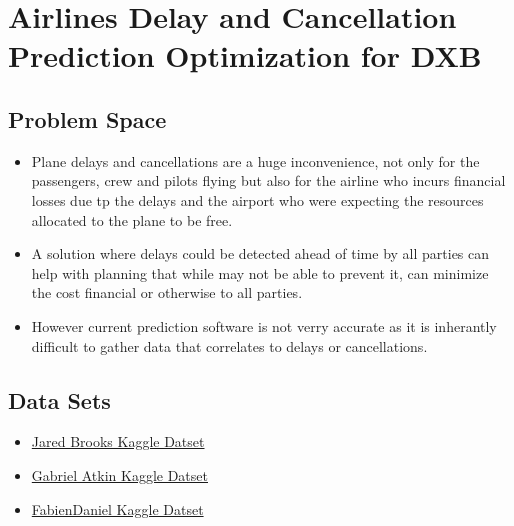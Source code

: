 \chapter{Airlines Delay and Cancellation Prediction Optimization for DXB}

\section{Problem Space}
\begin{itemize}
    \item {
        Plane delays and cancellations are a huge inconvenience, not only for the passengers, crew and pilots flying but also for the 
        airline who incurs financial losses due tp the delays and the airport who were expecting the resources allocated 
        to the plane to be free. 
    }
    \item{
        A solution where delays could be detected ahead of time by all parties can help with planning that while may not be able to 
        prevent it, can minimize the cost financial or otherwise to all parties.
    }
    \item{
        However current prediction software is not verry accurate as it is inherantly difficult to gather data that correlates
        to delays or cancellations.
    }
\end{itemize}

\section{Data Sets}
\begin{itemize}
    \item \href{https://www.kaggle.com/code/jcbrooks/airlines-delay-and-cancellation-analysis#Delay-Time-Regression-Summary:}{Jared Brooks Kaggle Datset}
    \item \href{https://www.kaggle.com/code/gcdatkin/flight-cancellation-prediction}{Gabriel Atkin Kaggle Datset}
    \item \href{https://www.kaggle.com/code/fabiendaniel/predicting-flight-delays-tutorial}{FabienDaniel Kaggle Datset}
\end{itemize}

